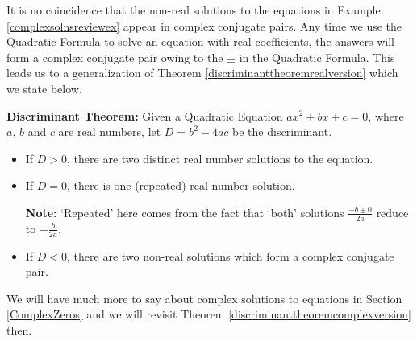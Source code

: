 \documentclass{ximera}
\begin{document}
It is no coincidence that the non-real solutions to the equations in Example \ref{complexsolnsreviewex} appear in  complex conjugate pairs. Any time we use the Quadratic Formula to solve an equation with \underline{real} coefficients, the answers will form a  complex conjugate pair owing to the $\pm$ in the Quadratic Formula.  This leads us to a generalization of Theorem \ref{discriminanttheoremrealversion} which we state below.

\begin{theorem} \textbf{Discriminant Theorem:} \label{discriminanttheoremcomplexversion} Given a Quadratic Equation $ax^2 + bx + c = 0$, where $a$, $b$ and $c$ are real numbers, let $D = b^2 - 4ac$ be the discriminant.

\begin{itemize}

\item  If $D > 0$, there are two distinct real number solutions to the equation. 

\item  If $D = 0$, there is one (repeated) real number solution.  

\textbf{Note:}  `Repeated' here comes from the fact that `both' solutions $\frac{-b \pm 0}{2a}$ reduce to $-\frac{b}{2a}$.

\item  If $D < 0$, there are two non-real solutions which form a complex conjugate pair.

\end{itemize}

\end{theorem}

 

We will have much more to say about complex solutions to equations in Section \ref{ComplexZeros} and we will revisit Theorem \ref{discriminanttheoremcomplexversion} then.


\closegraphsfile
\end{document}
